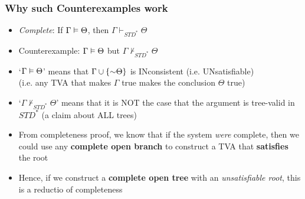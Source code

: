 \begin{frame}
\frametitle{Why such Counterexamples work}

\begin{itemize}[<+->]



\item \emph{Complete}: If $\Gamma \vDash \Theta$, then $\Gamma \vdash_{STD^{\ast}} \Theta$

\item Counterexample: $\Gamma \vDash \Theta$ but $\Gamma \nvdash_{STD^{\ast}} \Theta$




\bi

\item `$\Gamma \vDash \Theta$' means that $\Gamma \cup \{\enot \Theta \}$ is INconsistent (i.e. UNsatisfiable) \\ (i.e. any TVA that makes $\Gamma$ true makes the conclusion $\Theta$ true) 

\item `$\Gamma \nvdash_{STD^{\ast}} \Theta$' means that it is NOT the case that the argument is tree-valid in $STD^{\ast}$ (a claim about ALL trees)

\item From completeness proof, we know that if the system \textit{were} complete, then we could use any \textbf{\textcolor{OGlyallpink}{complete open branch}} to construct a TVA that \textbf{\textcolor{OGlyallpink}{satisfies}} the root

\item Hence, if we construct a \textbf{\textcolor{OGlyallpink}{complete open tree}} with an \emph{unsatisfiable root}, this is a reductio of completeness

\end{itemize}




\end{frame}

